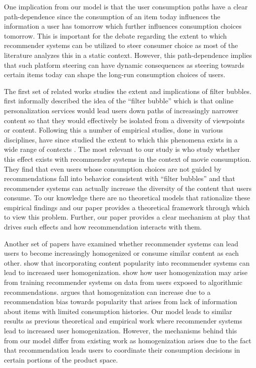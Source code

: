 \documentclass[format=acmsmall, review=false]{acmart}
\newcommand{\xhdr}[1]{\vspace{1mm} \noindent{\bf #1}}
\begin{document}
\par 
One implication from our model is that the user consumption paths have a clear path-dependence since the consumption of an item today influences the information a user has tomorrow which further influences consumption choices tomorrow. This is important for the debate regarding the extent to which recommender systems can be utilized to steer consumer choice as most of the literature analyzes this in a static context. However, this path-dependence implies that such platform steering can have dynamic consequences as steering towards certain items today can shape the long-run consumption choices of users. 

\xhdr{Related Work.} 
The first set of related works studies the extent and implications of filter bubbles. \cite{pariser2011filter} first informally described the idea of the ``filter bubble'' which is that online personalization services would lead users down paths of increasingly narrower content so that they would effectively be isolated from a diversity of viewpoints or content. Following this a number of empirical studies, done in various disciplines, have since studied the extent to which this phenomena exists in a wide range of contexts \cite{flaxman2016filter,hosanagar2013will,moller2018blame,nguyen2014exploring}. The most relevant to our study is \cite{nguyen2014exploring} who study whether this effect exists with recommender systems in the context of movie consumption. They find that even users whose consumption choices are not guided by recommendations fall into behavior consistent with ``filter bubbles'' and that recommender systems can actually increase the diversity of the content that users consume. To our knowledge there are no theoretical models that rationalize these empirical findings and our paper provides a theoretical framework through which to view this problem. Further, our paper provides a clear mechanism at play that drives such effects and how recommendation interacts with them.
\par 
Another set of papers have examined whether recommender systems can lead users to become increasingly homogenized or consume similar content as each other. \cite{celma2008hits, treviranus2009value} show that incorporating content popularity into recommender systems can lead to increased user homogenization. \cite{chaney2018algorithmic} show how user homogenization may arise from training recommender systems on data from users exposed to algorithmic recommendations. \cite{fleder2009blockbuster} argues that homogenization can increase due to a recommendation bias towards popularity that arises from lack of information about items with limited consumption histories. Our model leads to similar results as previous theoretical and empirical work where recommender systems lead to increased user homogenization. However, the mechanisms behind this from our model differ from existing work as homogenization arises due to the fact that recommendation leads users to coordinate their consumption decisions in certain portions of the product space.
\end{document}
